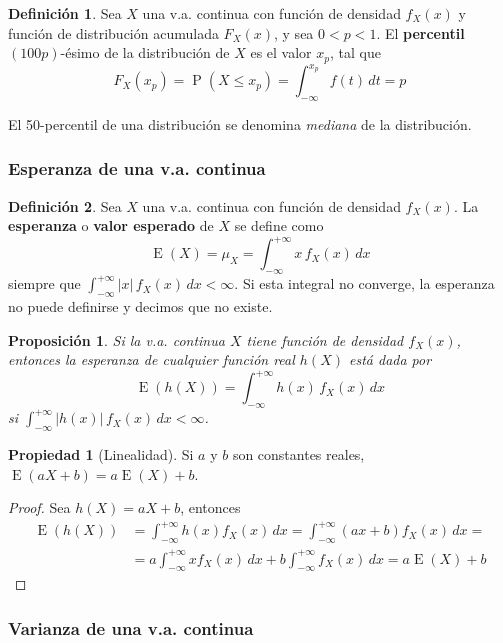\documentclass[11pt]{article}
\theoremstyle{plain}
\newtheorem*{pro}{Proposición}
\theoremstyle{definition}
\newtheorem*{defi}{Definición}
\newtheorem*{prop}{Propiedad}
\theoremstyle{remark}
\newcommand{\deft}[1]{\textbf{#1}}  %
\newcommand{\proba}{\ensuremath{\operatorname{P}}}  %
\newcommand{\esp}[0]{\ensuremath{\operatorname{E}}}  %
\begin{document}
    \begin{defi}
      Sea $X$ una v.a. continua con función de densidad $f_X(x)$ y función de distribución acumulada $F_X(x)$, y sea $0 < p < 1$. El \deft{percentil} $(100p)$-ésimo de la distribución de $X$ es el valor $x_p$, tal que
      \[ F_X(x_p) = \proba(X \leq x_p) = \int_{-\infty}^{x_p} f(t) \,dt = p \]

      El 50-percentil de una distribución se denomina \emph{mediana} de la distribución.
    \end{defi}

    \subsubsection{Esperanza de una v.a. continua}

      \begin{defi}
        Sea $X$ una v.a. continua con función de densidad $f_X(x)$. La \deft{esperanza} o \deft{valor esperado} de $X$ se define como
        \[ \esp(X) = \mu_X = \int_{-\infty}^{+\infty} x \, f_X(x) \,dx \]
        siempre que $\int_{-\infty}^{+\infty} |x| \, f_X(x) \,dx < \infty$. Si esta integral no converge, la esperanza no puede definirse y decimos que no existe.
      \end{defi}

      \begin{pro}
        Si la v.a. continua $X$ tiene función de densidad $f_X(x)$, entonces la esperanza de cualquier función real $h(X)$ está dada por
        \[ \esp(h(X)) = \int_{-\infty}^{+\infty} h(x) \, f_X(x) \,dx \]
        si $\int_{-\infty}^{+\infty} |h(x)| \, f_X(x) \,dx < \infty$.
      \end{pro}

      \begin{prop} [Linealidad]
        Si $a$ y $b$ son constantes reales, $\esp(aX + b) = a\esp(X) + b$.
      \end{prop}
      \begin{proof}
        Sea $h(X) = aX + b$, entonces
        \[ \begin{split}
        \esp(h(X)) &= \int_{-\infty}^{+\infty} h(x) f_X(x) \,dx = \int_{-\infty}^{+\infty} (ax + b) f_X(x) \,dx = \\
        &= a \int_{-\infty}^{+\infty} x f_X(x) \,dx + b \int_{-\infty}^{+\infty} f_X(x) \,dx = a \esp(X) + b
        \end{split} \]
      \end{proof}

    \subsubsection{Varianza de una v.a. continua}
\end{document}
